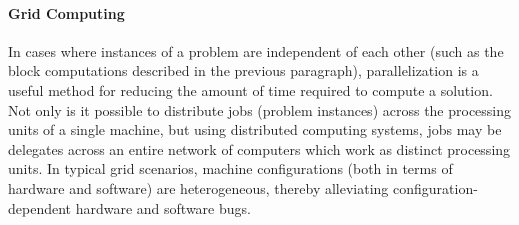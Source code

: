 \paragraph{Grid Computing}
In cases where instances of a problem are independent of each other (such as the block computations described in the previous paragraph), parallelization is a useful method for reducing the amount of time required to compute a solution. Not only is it possible to distribute jobs (problem instances) across the processing units of a single machine, but using distributed computing systems, jobs may be delegates across an entire network of computers which work as distinct processing units. In typical grid scenarios, machine configurations (both in terms of hardware and software) are heterogeneous, thereby alleviating configuration-dependent hardware and software bugs. 